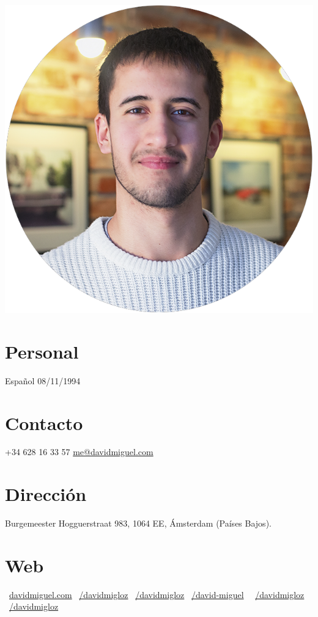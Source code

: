 \documentclass[]{friggeri-cv}
\begin{document}
      

\begin{aside}
  \includegraphics[scale=0.18]{img/profile.png}
  \section{Personal}
    Español
    08/11/1994
    ~  
  \section{Contacto}
    +34 628 16 33 57
    \href{mailto:me@davidmiguel.com}{me@davidmiguel.com}
    ~  
  \section{Dirección} 
    Burgemeester Hogguerstraat 983,
    1064 EE, Ámsterdam
    (Países Bajos).
    ~    
  \section{Web}
    \faGlobe\ \href{http://davidmiguel.com}{davidmiguel.com}
    \faLinkedin\ \href{https://www.linkedin.com/in/davidmigloz}{/davidmigloz}
    \faGithub\ \href{https://github.com/davidmigloz/}{/davidmigloz}
    \faStackOverflow\ \href{http://stackoverflow.com/users/6305235/david-miguel}{/david-miguel}    
    \faFacebook\ \ \href{https://www.facebook.com/DavidMigLoz}{/davidmigloz}
    \faTwitter\ \href{https://twitter.com/DavidMigLoz}{/davidmigloz}
    ~

\end{aside}
\end{document}
